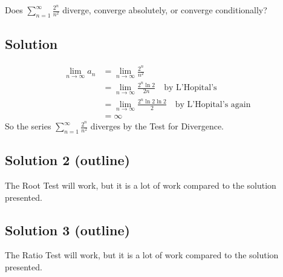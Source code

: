 \documentclass{article}
\begin{document}
\noindent
Does $\displaystyle \sum_{n=1}^\infty \frac{2^n}{n^2}$
diverge, converge absolutely, or converge conditionally?

\subsection*{Solution}

\begin{align*}
\lim_{n \to \infty} a_n
&= \lim_{n \to \infty} \frac{2^n}{n^2}\\
&= \lim_{n \to \infty} \frac{2^n \ln 2}{2n} \quad\text{by L'Hopital's}\\
&= \lim_{n \to \infty} \frac{2^n \ln 2 \ln 2}{2} \quad\text{by L'Hopital's again}\\
&= \infty
\end{align*}
So the series $\displaystyle \sum_{n=1}^\infty \frac{2^n}{n^2}$ diverges by the Test for Divergence.


\subsection*{Solution 2 (outline)}

The Root Test will work, but it is a lot of work compared to the solution presented.

\subsection*{Solution 3 (outline)}

The Ratio Test will work, but it is a lot of work compared to the solution presented.
\end{document}
